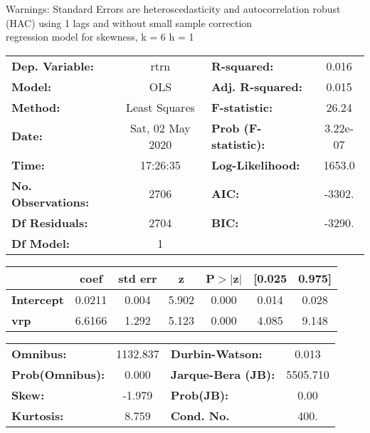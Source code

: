 Warnings: \newline
 [1] Standard Errors are heteroscedasticity and autocorrelation robust (HAC) using 1 lags and without small sample correction\\ 

regression model for skewness, k = 6 h = 1\begin{center}
\begin{tabular}{lclc}
\toprule
\textbf{Dep. Variable:}    &       rtrn       & \textbf{  R-squared:         } &     0.016   \\
\textbf{Model:}            &       OLS        & \textbf{  Adj. R-squared:    } &     0.015   \\
\textbf{Method:}           &  Least Squares   & \textbf{  F-statistic:       } &     26.24   \\
\textbf{Date:}             & Sat, 02 May 2020 & \textbf{  Prob (F-statistic):} &  3.22e-07   \\
\textbf{Time:}             &     17:26:35     & \textbf{  Log-Likelihood:    } &    1653.0   \\
\textbf{No. Observations:} &        2706      & \textbf{  AIC:               } &    -3302.   \\
\textbf{Df Residuals:}     &        2704      & \textbf{  BIC:               } &    -3290.   \\
\textbf{Df Model:}         &           1      & \textbf{                     } &             \\
\bottomrule
\end{tabular}
\begin{tabular}{lcccccc}
                   & \textbf{coef} & \textbf{std err} & \textbf{z} & \textbf{P$> |$z$|$} & \textbf{[0.025} & \textbf{0.975]}  \\
\midrule
\textbf{Intercept} &       0.0211  &        0.004     &     5.902  &         0.000        &        0.014    &        0.028     \\
\textbf{vrp}       &       6.6166  &        1.292     &     5.123  &         0.000        &        4.085    &        9.148     \\
\bottomrule
\end{tabular}
\begin{tabular}{lclc}
\textbf{Omnibus:}       & 1132.837 & \textbf{  Durbin-Watson:     } &    0.013  \\
\textbf{Prob(Omnibus):} &   0.000  & \textbf{  Jarque-Bera (JB):  } & 5505.710  \\
\textbf{Skew:}          &  -1.979  & \textbf{  Prob(JB):          } &     0.00  \\
\textbf{Kurtosis:}      &   8.759  & \textbf{  Cond. No.          } &     400.  \\
\bottomrule
\end{tabular}
\end{center}


